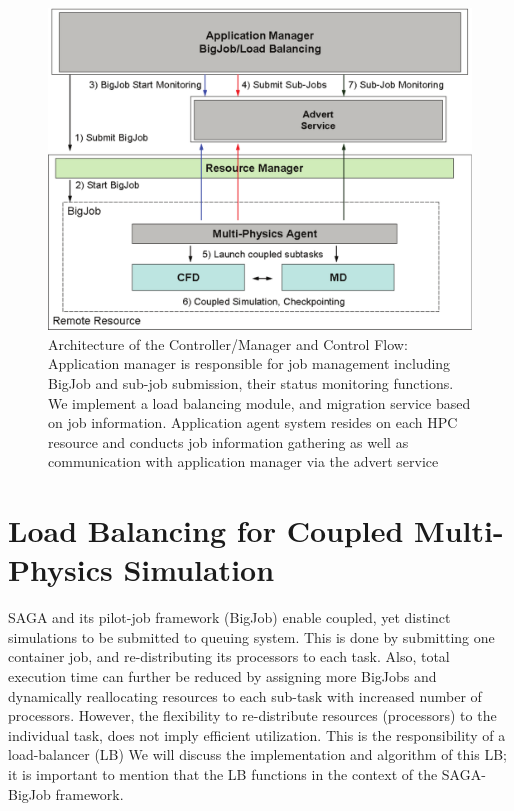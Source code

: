 \documentclass[conference,final]{IEEEtran}
\begin{document}
\begin{figure}
\centering
\includegraphics[scale=0.38]{Structure_of_BigJob}
\caption{\small Architecture of the Controller/Manager and Control Flow: Application manager is responsible for job management including BigJob and sub-job submission, their status monitoring functions. We implement a load balancing module, and migration service based on job information. Application agent system resides on each HPC resource and conducts job information gathering as well as communication with application manager via the advert service}
\label{Fig:BigJob_Structure}
\end{figure}



\section{Load Balancing for Coupled Multi-Physics Simulation}


SAGA and its pilot-job framework (BigJob) enable coupled, yet distinct simulations to be
submitted to queuing system.  This is done by submitting one container job, and re-distributing its processors to each task.  Also, total execution time can further be reduced by assigning more BigJobs and dynamically reallocating resources to each sub-task with increased number of processors.
However, the flexibility to re-distribute resources (processors) to the individual task, does
not imply efficient utilization. This is the responsibility of a load-balancer (LB)
We will discuss the implementation and algorithm of this LB; it is important
to mention that the LB functions in the context of the SAGA-BigJob framework.
\end{document}
